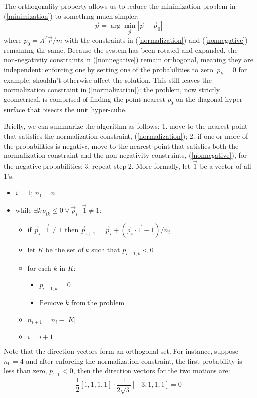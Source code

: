 The orthogonality property allows us to reduce the minimization problem 
in (\ref{minimization}) to something much simpler:
\begin{equation}
	\vec p = \arg \min_{\vec p} | \vec p - \vec p_0 |
\end{equation}
where $p_0 = A^T \vec r/m$ with the constraints in (\ref{normalization}) and
(\ref{nonnegative}) remaining the same.
Because the system has been rotated and expanded, the non-negativity 
constraints in (\ref{nonnegative}) remain orthogonal, meaning they are 
independent: enforcing one by setting one of the probabilities to zero, 
$p_k=0$ for example, shouldn't otherwise affect the solution.
This still leaves the normalization constraint in (\ref{normalization}):
the problem, now strictly geometrical, is comprised of finding the point nearest $p_0$ on the diagonal hyper-surface that bisects the unit hyper-cube.

Briefly, we can summarize the algorithm as follows:
1. move to the nearest point that satisfies the normalization constraint,
(\ref{normalization}); 2. if one or more of the probabilities is negative,
move to the nearest point that satisfies both 
the normalization constraint
and the non-negativity constraints, (\ref{nonnegative}), for the negative probabilities;
3. repeat step 2.
More formally, let $\vec 1$ be a vector of all $1$'s:
\begin{itemize}
	\item $i=1$; $n_1=n$
	\item while $\exists k \, p_{ik} \le 0 \lor \vec p_i \cdot \vec 1 \ne 1$:
	\begin{itemize}
		\item if $\vec p_i \cdot \vec 1 \ne 1$ then 
		$\vec p_{i+1} = \vec p_i + (\vec p_i \cdot \vec 1 - 1)/n_i$
		\item let $K$ be the set of $k$ such that $p_{i+1,k} < 0$
		\item for each $k$ in $K$:
		\begin{itemize}
			\item $p_{i+1,k}=0$
			\item Remove $k$ from the problem
		\end{itemize}
		\item $n_{i+1}=n_i-|K|$
		\item $i=i+1$
	\end{itemize}
\end{itemize}

Note that the direction vectors form an orthogonal set.
For instance, suppose $n_0=4$ and after enforcing the normalization constraint,
the first probability is less than zero, $p_{1,1} < 0$,
then the direction vectors for the two motions are:
\begin{equation}
	\frac{1}{2}[1, 1, 1, 1] \cdot \frac{1}{2\sqrt{3}} [-3, 1, 1, 1] = 0
\end{equation}

